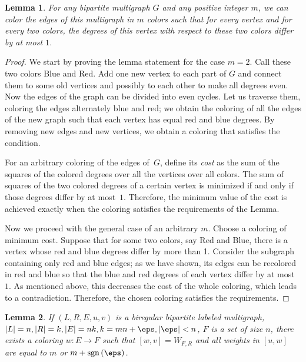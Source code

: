 \documentclass[12pt]{article}
\newtheorem{lemma}{Lemma}[section]
\theoremstyle{definition}
\theoremstyle{plain}
\begin{document}
\begin{lemma} \label{Coloring}
For any bipartite multigraph $G$ and any positive integer $m$, we can color the edges of this multigraph in $m$ colors such that for every vertex and for every two colors, the degrees of this vertex with respect to these two colors differ by at most $1$.
\end{lemma}

\begin{proof} We start by proving the lemma statement for the case $m=2$. Call these two colors Blue and Red. Add one new vertex to each part of $G$ and connect them to some old vertices and possibly to each other to make all degrees even. Now the edges of the graph can be divided into even cycles. Let us traverse them, coloring the edges alternately blue and red; we obtain the coloring of all the edges of the new graph such that each vertex has equal red and blue degrees.
By removing new edges and new vertices, we obtain a coloring that satisfies the condition.

For an arbitrary coloring of the edges of~$G$, define its \emph{cost} as the sum of the squares of the colored degrees over all the vertices over all colors. The sum of squares of the two colored degrees of a certain vertex is minimized if and only if those degrees differ by at most~$1$. Therefore, the minimum value of the cost is achieved exactly when the coloring satisfies the requirements of the Lemma.

Now we proceed with the general case of an arbitrary $m$. Choose a coloring of minimum cost. Suppose that for some two colors, say Red and Blue, there is a vertex whose red and blue degrees differ by more than 1. Consider the subgraph containing only red and blue edges; as we have shown, its edges can be recolored in red and blue so that the blue and red degrees of each vertex differ by at most $1$. As mentioned above, this decreases the cost of the whole coloring, which leads to a contradiction. Therefore, the chosen coloring satisfies the requirements.
\end{proof}

\begin{lemma} \label{windFromColoring}
If $(L,R,E,u,v)$ is a biregular bipartite labeled multigraph, $|L|=n,|R|=k,|E|=nk,k=mn+\eps, |\eps| < n$, $F$ is a set of size $n$, there exists a coloring $w : E \rightarrow F$ such that $[w,v]=W_{F,R}$ and all weights in $[u,w]$ are equal to $m$ or $m+{\rm sgn}\,(\eps)$.
\end{lemma}
\end{document}
